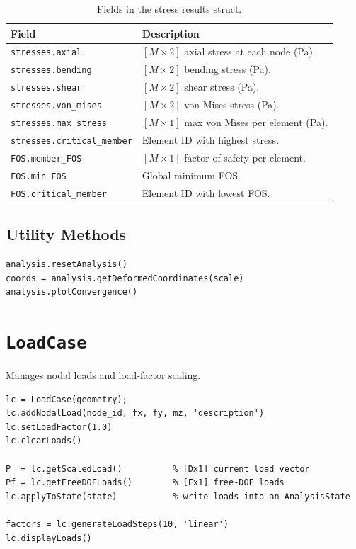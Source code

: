 \begin{table}[H]
\centering
\caption{Fields in the stress results struct.}
\begin{tabularx}{\textwidth}{lX}
\toprule
\textbf{Field} & \textbf{Description} \\
\midrule
\texttt{stresses.axial}       & $[M\times2]$ axial stress at each node (Pa). \\
\texttt{stresses.bending}     & $[M\times2]$ bending stress (Pa). \\
\texttt{stresses.shear}       & $[M\times2]$ shear stress (Pa). \\
\texttt{stresses.von\_mises}  & $[M\times2]$ von Mises stress (Pa). \\
\texttt{stresses.max\_stress} & $[M\times1]$ max von Mises per element (Pa). \\
\texttt{stresses.critical\_member} & Element ID with highest stress. \\
\texttt{FOS.member\_FOS}      & $[M\times1]$ factor of safety per element. \\
\texttt{FOS.min\_FOS}         & Global minimum FOS. \\
\texttt{FOS.critical\_member} & Element ID with lowest FOS. \\
\bottomrule
\end{tabularx}
\end{table}

\subsection{Utility Methods}

\begin{lstlisting}
analysis.resetAnalysis()
coords = analysis.getDeformedCoordinates(scale)
analysis.plotConvergence()
\end{lstlisting}

\section{\texttt{LoadCase}}
\label{sec:api:loadcase}

Manages nodal loads and load-factor scaling.

\begin{lstlisting}
lc = LoadCase(geometry);
lc.addNodalLoad(node_id, fx, fy, mz, 'description')
lc.setLoadFactor(1.0)
lc.clearLoads()

P  = lc.getScaledLoad()          % [Dx1] current load vector
Pf = lc.getFreeDOFLoads()        % [Fx1] free-DOF loads
lc.applyToState(state)           % write loads into an AnalysisState

factors = lc.generateLoadSteps(10, 'linear')
lc.displayLoads()
\end{lstlisting}

